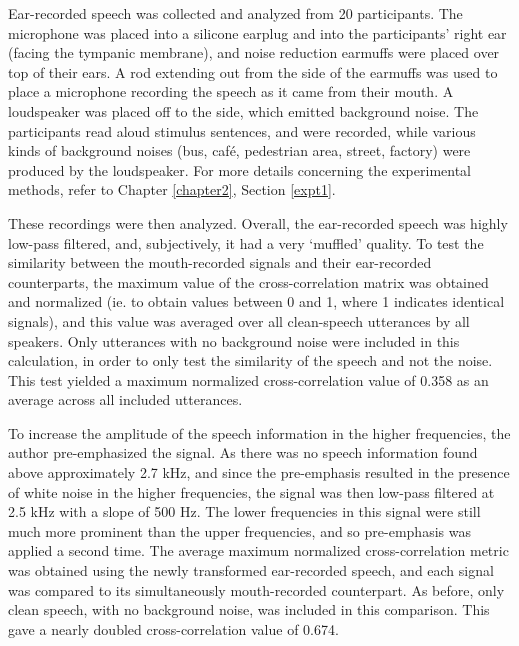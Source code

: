 Ear-recorded speech was collected and analyzed from 20 participants.  The microphone was placed into a silicone earplug and into the participants' right ear (facing the tympanic membrane), and noise reduction earmuffs were placed over top of their ears.  A rod extending out from the side of the earmuffs was used to place a microphone recording the speech as it came from their mouth.  A loudspeaker was placed off to the side, which emitted background noise.  The participants read aloud stimulus sentences, and were recorded, while various kinds of background noises (bus, caf\'{e}, pedestrian area, street, factory) were produced by the loudspeaker.  For more details concerning the experimental methods, refer to Chapter \ref{chapter2}, Section \ref{expt1}.

These recordings were then analyzed.  Overall, the ear-recorded speech was highly low-pass filtered, and, subjectively, it had a very `muffled' quality.  To test the similarity between the mouth-recorded signals and their ear-recorded counterparts, the maximum value of the cross-correlation matrix was obtained and normalized (ie. to obtain values between 0 and 1, where 1 indicates identical signals), and this value was averaged over all clean-speech utterances by all speakers.  Only utterances with no background noise were included in this calculation, in order to only test the similarity of the speech and not the noise.  This test yielded a maximum normalized cross-correlation value of 0.358 as an average across all included utterances.

To increase the amplitude of the speech information in the higher frequencies, the author pre-emphasized the signal.  As there was no speech information found above approximately 2.7 kHz, and since the pre-emphasis resulted in the presence of white noise in the higher frequencies, the signal was then low-pass filtered at 2.5 kHz with a slope of 500 Hz.  The lower frequencies in this signal were still much more prominent than the upper frequencies, and so pre-emphasis was applied a second time.  The average maximum normalized cross-correlation metric was obtained using the newly transformed ear-recorded speech, and each signal was compared to its simultaneously mouth-recorded counterpart.  As before, only clean speech, with no background noise, was included in this comparison.  This gave a nearly doubled cross-correlation value of 0.674.


